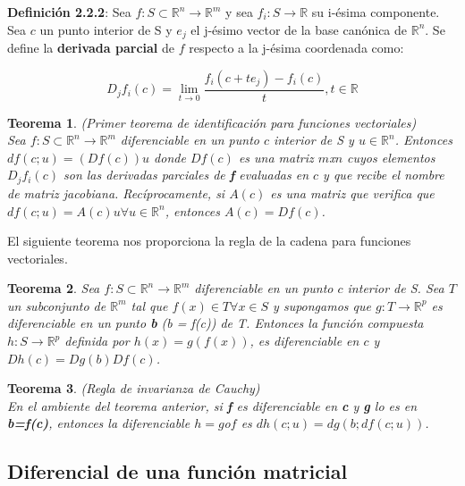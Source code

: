\documentclass{article}
\theoremstyle{theorem-style}  %
\newtheorem{theorem}{Teorema}[section]  %
\theoremstyle{definition}
\theoremstyle{example-style}
\begin{document}
\textbf{Definición 2.2.2}: Sea $f: S\subset \mathbb{R}^n \rightarrow \mathbb{R}^m$ y sea $f_i: S \rightarrow \mathbb{R}$ su i-ésima componente. Sea $c$ un punto interior de S y $e_j$ el j-ésimo vector de la base canónica de $\mathbb{R}^n$. Se define la \textbf{derivada parcial} de $f$ respecto a la j-ésima coordenada como: 

$$ D_jf_i(c) = \lim_{t\to0} \frac{f_i(c + te_j ) - f_i(c)}{t}, t\in \mathbb{R} $$  
 
\begin{theorem} (Primer teorema de identificación para funciones vectoriales)\\
	Sea $f: S\subset \mathbb{R}^n \rightarrow \mathbb{R}^m$ diferenciable en un punto $c$ interior de S y $u  \in \mathbb{R}^n$. Entonces $df(c;u)=(Df(c))u$ donde $Df(c)$ es una matriz $m$x$n$ cuyos elementos $D_jf_i(c)$ son las derivadas parciales de \textbf{f} evaluadas en $c$ y que recibe el nombre de matriz jacobiana. Recíprocamente, si $A(c)$ es una matriz que verifica que $df(c;u)=A(c)u \forall u\in \mathbb{R}^n$, entonces $A(c) = Df(c)$. 
\end{theorem}

El siguiente teorema nos proporciona la regla de la cadena para funciones vectoriales.

\begin{theorem}
	Sea $f: S\subset \mathbb{R}^n \rightarrow \mathbb{R}^m$ diferenciable en un punto $c$ interior de S. Sea $T$ un subconjunto de $\mathbb{R}^m$ tal que $f(x) \in T \forall x \in S$ y supongamos que $g: T \rightarrow \mathbb{R}^p$ es diferenciable en un punto \textbf{b} (b = f(c)) de T. Entonces la función compuesta $h: S \rightarrow \mathbb{R}^p$ definida por $h(x)=g(f(x))$, es diferenciable en $c$ y $Dh(c)=Dg(b)Df(c)$.
\end{theorem}

\begin{theorem} (Regla de invarianza de Cauchy) \\
	En el ambiente del teorema anterior, si \textbf{f} es diferenciable en \textbf{c} y \textbf{g} lo es en \textbf{b=f(c)}, entonces la diferenciable $h=g$o$f$ es $dh(c;u) = dg(b;df(c;u))$.   
	
\end{theorem}

\subsection{Diferencial de una función matricial}
\end{document}
